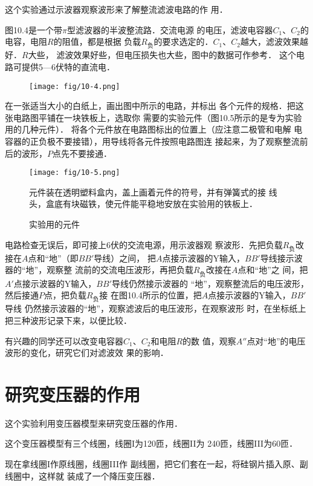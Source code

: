 这个实验通过示波器观察波形来了解整流滤波电路的作
用．

图10.4是一个带$\pi$型滤波器的半波整流路．交流电源
的电压，滤波电容器$C_1$、$C_2$的电容，电阻$R$的阻值，都是根据
负载$R_{\text{负}}$的要求选定的．$C_1$、$C_2$越大，滤波效果越好．$R$大些，
滤波效果好些，但电压损失也大些，图中的数据可作参考．
这个电路可提供5—6伏特的直流电．
\begin{figure}[htp]\centering
    \texttt{[image: fig/10-4.png]}
    \caption{}
    \end{figure}

在一张适当大小的白纸上，画出图中所示的电路，并标出
各个元件的规格．把这张电路图平铺在一块铁板上，选取你
需要的实验元件（图10.5所示的是专为实验用的几种元件）．
将各个元件放在电路图标出的位置上（应注意二极管和电解
电容器的正负极不要接错），用导线将各元件按照电路图连
接起来，为了观察整流前后的波形，$P$点先不要接通．

\begin{figure}[htp]\centering
    \texttt{[image: fig/10-5.png]}

    元件装在透明塑料盒内，盖上画着元件的符号，并有弹簧式的接
线头，盒底有块磁铁，使元件能平稳地安放在实验用的铁板上．
    \caption{实验用的元件}
    \end{figure}

电路检查无误后，即可接上6伏的交流电源，用示波器观
察波形．先把负载$R_{\text{负}}$改接在$A$点和“地”（即$BB'$导线）之间，
把$A$点接示波器的Y输入，$BB'$导线接示波器的“地”，观察整
流前的交流电压波形，再把负载$R_{\text{负}}$改接在$A$点和“地”之
间，把$A'$点接示波器的Y输入，$BB'$导线仍然接示波器的
“地”，观察整流后的电压波形，然后接通$P$点，把负载$R_{\text{负}}$接
在图10.4所示的位置，把$A$点接示波器的Y输入，$BB'$导线
仍然接示波器的“地”，观察滤波后的电压波形，在观察波形
时，在坐标纸上把三种波形记录下来，以便比较．

有兴趣的同学还可以改变电容器$C_1$、$C_2$和电阻$R$的数
值，观察$A''$点对“地”的电压波形的变化，研究它们对滤波效
果的影响．

\section{研究变压器的作用}
这个实验利用变压器模型来研究变压器的作用．

这个变压器模型有三个线圈，线圈I为120匝，线圈II为
240匝，线圈III为60匝．

现在拿线圈I作原线圈，线圈III作
副线圈，把它们套在一起，将硅钢片插入原、副线圈中，这样就
装成了一个降压变压器．

